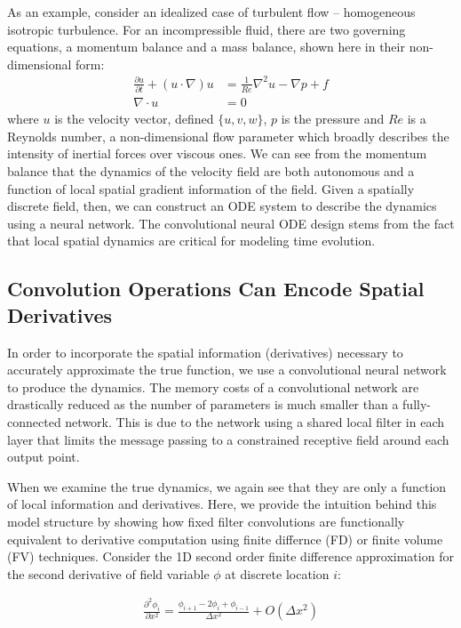 \documentclass[book.tex]{subfiles}
\begin{document}
As an example, consider an idealized case of turbulent flow – homogeneous isotropic turbulence. For an incompressible fluid, there are two governing equations, a momentum balance and a mass balance, shown here in their non-dimensional form:
\begin{align}
\frac{\partial u}{\partial t}+(u\cdot\nabla)u&=\frac{1}{Re}\nabla^2u-\nabla p+f \\
\nabla\cdot u &=0
\label{eq:ns}
\end{align}
where $u$ is the velocity vector, defined $\{ u,v,w\}$, $p$ is the pressure and $Re$ is a Reynolds number, a non-dimensional flow parameter which broadly describes the intensity of inertial forces over viscous ones.  We can see from the momentum balance that the dynamics of the velocity field are both autonomous and a function of local spatial gradient information of the field. Given a spatially discrete field, then, we can construct an ODE system to describe the dynamics using a neural network. The convolutional neural ODE design stems from the fact that local spatial dynamics are critical for modeling time evolution.

\subsection{Convolution Operations Can Encode Spatial Derivatives}
In order to incorporate the spatial information (derivatives) necessary to accurately approximate the true function, we use a convolutional neural network to produce the dynamics. The memory costs of a convolutional network are drastically reduced as the number of parameters is much smaller than a fully-connected network. This is due to the network using a shared local filter in each layer that limits the message passing to a constrained receptive field around each output point. 

When we examine the true dynamics, we again see that they are only a function of local information and derivatives. Here, we provide the intuition behind this model structure by showing how fixed filter convolutions are functionally equivalent to derivative computation using finite differnce (FD) or finite volume (FV) techniques. Consider the 1D second order finite difference approximation for the second derivative of field variable $\phi$ at discrete location $i$:

\begin{align}
\frac{\partial^2 \phi_i}{\partial x^2} = \frac{\phi_{i+1} -2 \phi_{i} + \phi_{i-1}}{\Delta x^2} + O(\Delta x^2)
\end{align}
\end{document}
